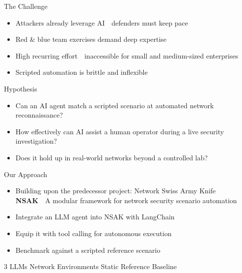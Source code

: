 
\begin{frame}{The Challenge}
  \\[1em]
  \begin{itemize}
    \setlength\itemsep{0.8em}
    \item[\faAngleRight] Attackers already leverage AI~\textthreequartersemdash~defenders must keep pace
    \item[\faAngleRight] Red \& blue team exercises demand deep expertise
    \item[\faAngleRight] High recurring effort~\textthreequartersemdash~inaccessible for small and medium-sized enterprises
    \item[\faAngleRight] Scripted automation is brittle and inflexible
  \end{itemize}
\end{frame}

\begin{frame}{Hypothesis}
  \\[1em]
  \begin{itemize}
    \setlength\itemsep{0.8em}
    \item[\faAngleRight] Can an AI agent match a scripted scenario at automated network reconnaissance?
    \item[\faAngleRight] How effectively can AI assist a human operator during a live security investigation?
    \item[\faAngleRight] Does it hold up in real-world networks beyond a controlled lab?
  \end{itemize}
\end{frame}

\begin{frame}{Our Approach}
  \\[1em]
  \begin{itemize}
    \setlength\itemsep{0.8em}
    \item[\faAngleRight] Building upon the predecessor project: Network Swiss Army Knife\\
    \textbf{NSAK}~\textthreequartersemdash~A modular framework for network security scenario automation
    \item[\faAngleRight] Integrate an LLM agent into NSAK with LangChain
    \item[\faAngleRight] Equip it with tool calling for autonomous execution
    \item[\faAngleRight] Benchmark against a scripted reference scenario
  \end{itemize}
  \vspace{1em}
  \begin{center}
    {\small 3 LLMs \quad\textbullet{} Network Environments \quad\textbullet\quad Static Reference Baseline}
  \end{center}
\end{frame}
